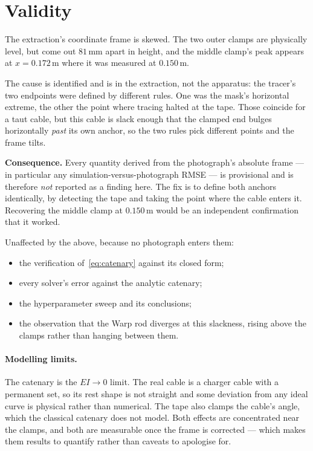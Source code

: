 \documentclass[11pt,a4paper]{article}
\begin{document}
\section{Validity}
\label{sec:validity}

\begin{tcolorbox}[colback=red!4!white,colframe=red!55!black,
                   title=Simulation-versus-photograph comparison is NOT yet valid]
The extraction's coordinate frame is skewed. The two outer clamps are
physically level, but come out $81$\,mm apart in height, and the middle clamp's
peak appears at $x = 0.172$\,m where it was measured at $0.150$\,m.

\medskip
The cause is identified and is in the extraction, not the apparatus: the
tracer's two endpoints were defined by different rules. One was the mask's
horizontal extreme, the other the point where tracing halted at the tape. Those
coincide for a taut cable, but this cable is slack enough that the clamped end
bulges horizontally \emph{past} its own anchor, so the two rules pick
different points and the frame tilts.

\medskip
\textbf{Consequence.} Every quantity derived from the photograph's absolute
frame --- in particular any simulation-versus-photograph RMSE --- is
provisional and is therefore \emph{not} reported as a finding here. The fix
is to define both anchors identically, by detecting the tape and taking the
point where the cable enters it. Recovering the middle clamp at $0.150$\,m
would be an independent confirmation that it worked.
\end{tcolorbox}

\noindent Unaffected by the above, because no photograph enters them:
\begin{itemize}
  \item the verification of~\eqref{eq:catenary} against its closed form;
  \item every solver's error against the analytic catenary;
  \item the hyperparameter sweep and its conclusions;
  \item the observation that the Warp rod diverges at this slackness, rising
        above the clamps rather than hanging between them.
\end{itemize}

\paragraph{Modelling limits.} The catenary is the $EI \to 0$ limit. The real
cable is a charger cable with a permanent set, so its rest shape is not
straight and some deviation from any ideal curve is physical rather than
numerical. The tape also clamps the cable's angle, which the classical
catenary does not model. Both effects are concentrated near the clamps, and
both are measurable once the frame is corrected --- which makes them results to
quantify rather than caveats to apologise for.
\end{document}
